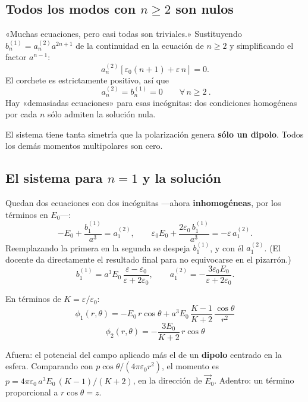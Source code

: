 \documentclass[12pt,a4paper]{article}
\begin{document}
\subsection{Todos los modos con \texorpdfstring{$n \ge 2$}{n ≥ 2} son nulos}

«Muchas ecuaciones, pero casi todas son triviales.» Sustituyendo
$b_n^{(1)} = a_n^{(2)} a^{2n+1}$ de la continuidad en la ecuación de $n\ge2$ y
simplificando el factor $a^{n-1}$:
\[
a_n^{(2)} \left[\varepsilon_0 (n+1) + \varepsilon\, n\right] = 0 .
\]
El corchete es estrictamente positivo, así que
\[
\boxed{\ a_n^{(2)} = b_n^{(1)} = 0 \qquad \forall\, n \ge 2\ }.
\]
Hay «demasiadas ecuaciones» para esas incógnitas: dos condiciones homogéneas por
cada $n$ sólo admiten la solución nula.

\begin{notebox}
El sistema tiene tanta simetría que la polarización genera \textbf{sólo un
dipolo}. Todos los demás momentos multipolares son cero.
\end{notebox}

\subsection{El sistema para \texorpdfstring{$n = 1$}{n = 1} y la solución}

Quedan dos ecuaciones con dos incógnitas ---ahora \textbf{inhomogéneas}, por los
términos en $E_0$---:
\[
-E_0 + \frac{b_1^{(1)}}{a^3} = a_1^{(2)},
\qquad
\varepsilon_0 E_0 + \frac{2\varepsilon_0\, b_1^{(1)}}{a^3} = -\varepsilon\, a_1^{(2)}.
\]
Reemplazando la primera en la segunda se despeja $b_1^{(1)}$, y con él
$a_1^{(2)}$. (El docente da directamente el resultado final para no equivocarse
en el pizarrón.)
\[
b_1^{(1)} = a^3 E_0\, \frac{\varepsilon-\varepsilon_0}{\varepsilon+2\varepsilon_0},
\qquad
a_1^{(2)} = -\frac{3\varepsilon_0 E_0}{\varepsilon+2\varepsilon_0}.
\]

\begin{keybox}
En términos de $K = \varepsilon/\varepsilon_0$:
\[
\boxed{\ \phi_1(r,\theta) = -E_0\, r\cos\theta
+ a^3 E_0\, \frac{K-1}{K+2}\, \frac{\cos\theta}{r^2}\ }
\]
\[
\boxed{\ \phi_2(r,\theta) = -\frac{3E_0}{K+2}\, r\cos\theta\ }
\]
\end{keybox}

\begin{notebox}
Afuera: el potencial del campo aplicado más el de un \textbf{dipolo} centrado en
la esfera. Comparando con $p\cos\theta/(4\pi\varepsilon_0 r^2)$, el momento es
$p = 4\pi\varepsilon_0\, a^3 E_0\,(K-1)/(K+2)$, en la dirección de $\vec E_0$.
Adentro: un término proporcional a $r\cos\theta = z$.
\end{notebox}
\end{document}
